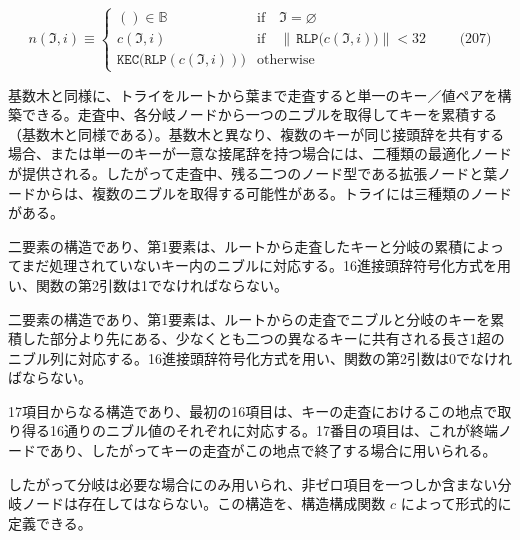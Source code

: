 \documentclass[
]{ltjsarticle}
\providecommand{\tightlist}{%
  \setlength{\itemsep}{0pt}\setlength{\parskip}{0pt}}
\begin{document}
\[n(\mathfrak{I}, i) \equiv \begin{cases}
() \in \mathbb{B} & \text{if} \quad \mathfrak{I} = \varnothing \\
c(\mathfrak{I}, i) & \text{if} \quad \lVert \, \texttt{RLP} \big( c(\mathfrak{I}, i) \big) \rVert < 32 \\
\texttt{KEC}\big(\texttt{RLP}( c(\mathfrak{I}, i)) \big) & \text{otherwise}
\end{cases} \qquad \text{(207)}\]

基数木と同様に、トライをルートから葉まで走査すると単一のキー／値ペアを構築できる。走査中、各分岐ノードから一つのニブルを取得してキーを累積する（基数木と同様である）。基数木と異なり、複数のキーが同じ接頭辞を共有する場合、または単一のキーが一意な接尾辞を持つ場合には、二種類の最適化ノードが提供される。したがって走査中、残る二つのノード型である拡張ノードと葉ノードからは、複数のニブルを取得する可能性がある。トライには三種類のノードがある。

\begin{description}
\tightlist
\item[Leaf]
二要素の構造であり、第1要素は、ルートから走査したキーと分岐の累積によってまだ処理されていないキー内のニブルに対応する。16進接頭辞符号化方式を用い、関数の第2引数は1でなければならない。
\item[Extension]
二要素の構造であり、第1要素は、ルートからの走査でニブルと分岐のキーを累積した部分より先にある、少なくとも二つの異なるキーに共有される長さ1超のニブル列に対応する。16進接頭辞符号化方式を用い、関数の第2引数は0でなければならない。
\item[Branch]
17項目からなる構造であり、最初の16項目は、キーの走査におけるこの地点で取り得る16通りのニブル値のそれぞれに対応する。17番目の項目は、これが終端ノードであり、したがってキーの走査がこの地点で終了する場合に用いられる。
\end{description}

したがって分岐は必要な場合にのみ用いられ、非ゼロ項目を一つしか含まない分岐ノードは存在してはならない。この構造を、構造構成関数
\(c\) によって形式的に定義できる。

\protect\hypertarget{eq-208}{}{}
\end{document}
